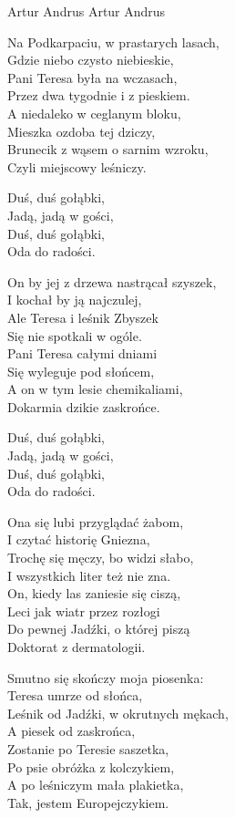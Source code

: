 {Artur Andrus}
{Artur Andrus}
\begin{text}
Na Podkarpaciu, w prastarych lasach,\\
Gdzie niebo czysto niebieskie,\\
Pani Teresa była na wczasach,\\
Przez dwa tygodnie i z pieskiem.\\
A niedaleko w ceglanym bloku,\\
Mieszka ozdoba tej dziczy,\\
Brunecik z wąsem o sarnim wzroku,\\
Czyli miejscowy leśniczy.

Duś, duś gołąbki,\\
Jadą, jadą w gości,\\
Duś, duś gołąbki,\\
Oda do radości.

On by jej z drzewa nastrącał szyszek,\\
I kochał by ją najczulej,\\
Ale Teresa i leśnik Zbyszek\\
Się nie spotkali w ogóle.\\
Pani Teresa całymi dniami\\
Się wyleguje pod słońcem,\\
A on w tym lesie chemikaliami,\\
Dokarmia dzikie zaskrońce.

Duś, duś gołąbki,\\
Jadą, jadą w gości,\\
Duś, duś gołąbki,\\
Oda do radości.

Ona się lubi przyglądać żabom,\\
I czytać historię Gniezna,\\
Trochę się męczy, bo widzi słabo,\\
I wszystkich liter też nie zna.\\
On, kiedy las zaniesie się ciszą,\\
Leci jak wiatr przez rozłogi\\
Do pewnej Jadźki, o której piszą\\
Doktorat z dermatologii.

Smutno się skończy moja piosenka:\\
Teresa umrze od słońca,\\
Leśnik od Jadźki, w okrutnych mękach,\\
A piesek od zaskrońca,\\
Zostanie po Teresie saszetka,\\
Po psie obróżka z kolczykiem,\\
A po leśniczym mała plakietka,\\
Tak, jestem Europejczykiem.


\end{text}

